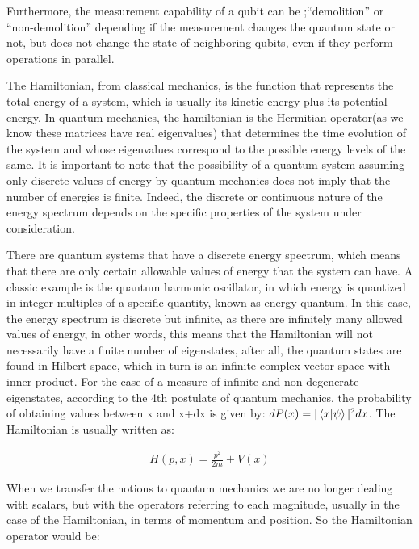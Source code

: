 \documentclass[
  journal=largetwo,
  year=2023,
]{cup-journal}
\begin{document}
Furthermore, the measurement capability of a qubit can be ;``demolition'' or ``non-demolition'' depending if the measurement changes the quantum state or not, but does not change the state of neighboring qubits, even if they perform operations in parallel.

The Hamiltonian, from classical mechanics, is the function that represents the total energy of a system, which is usually its kinetic energy plus its potential energy. In quantum mechanics, the hamiltonian is the Hermitian operator(as we know these matrices have real eigenvalues) that determines the time evolution of the system and whose eigenvalues correspond to the possible energy levels of the same.
It is important to note that the possibility of a quantum system assuming only discrete values of energy by quantum mechanics does not imply that the number of energies is finite. Indeed, the discrete or continuous nature of the energy spectrum depends on the specific properties of the system under consideration.

There are quantum systems that have a discrete energy spectrum, which means that there are only certain allowable values of energy that the system can have. A classic example is the quantum harmonic oscillator, in which energy is quantized in integer multiples of a specific quantity, known as energy quantum. In this case, the energy spectrum is discrete but infinite, as there are infinitely many allowed values of energy, in other words, this means that the Hamiltonian will not necessarily have a finite number of eigenstates, after all, the quantum states are found in Hilbert space, which in turn is an infinite complex vector space with inner product. For the case of a measure of infinite and non-degenerate eigenstates, according to the 4th postulate of quantum mechanics, the probability of obtaining values between x and x+dx is given by: \(dP(x) = |\braket{x}{\psi}|^{2}dx\). The Hamiltonian is usually written as:

\begin{equation}
  \begin{aligned}\label{eq:3}
    H(p, x) = \frac{p^2}{2m} + V(x)
  \end{aligned}
\end{equation}

When we transfer the notions to quantum mechanics we are no longer dealing with scalars, but with the operators referring to each magnitude, usually in the case of the Hamiltonian, in terms of momentum and position. So the Hamiltonian operator would be:
\end{document}
